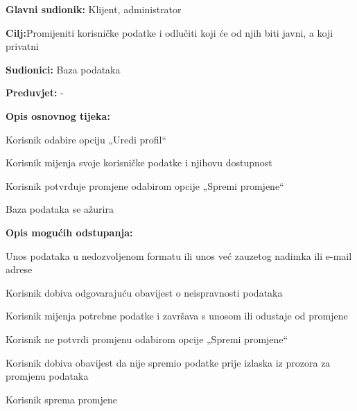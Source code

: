 						\begin{packed_item}
							
							\item \textbf{Glavni sudionik: }Klijent, administrator
							\item  \textbf{Cilj:}Promijeniti korisničke podatke i odlučiti koji će od njih biti javni, a koji privatni
							\item  \textbf{Sudionici:} Baza podataka
							\item  \textbf{Preduvjet:} -
							\item  \textbf{Opis osnovnog tijeka:}
							
							\item[] \begin{packed_enum}
								
								\item Korisnik odabire opciju „Uredi profil“  
								\item Korisnik mijenja svoje korisničke podatke i njihovu dostupnost 
								\item Korisnik potvrđuje promjene odabirom opcije „Spremi promjene“ 
								\item Baza podataka se ažurira 
								
								
							\end{packed_enum}
							
							\item  \textbf{Opis mogućih odstupanja:}
							
							\item[] \begin{packed_item}
								
								\item[2.a] Unos podataka u nedozvoljenom formatu ili unos već zauzetog nadimka ili e-mail adrese 
								\item[] \begin{packed_enum}
									
									\item Korisnik dobiva odgovarajuću obavijest o neispravnosti podataka 
									\item Korisnik mijenja potrebne podatke i završava s unosom ili odustaje od promjene 
									
								\end{packed_enum}
								\item[3.a] Korisnik ne potvrdi promjenu odabirom opcije „Spremi promjene“    
								\item[] \begin{packed_enum}
									
									\item Korisnik dobiva obavijest da nije spremio podatke prije izlaska iz prozora za promjenu podataka   
									\item Korisnik sprema promjene 
									
								\end{packed_enum}
								
								
								
							\end{packed_item}
						\end{packed_item}
